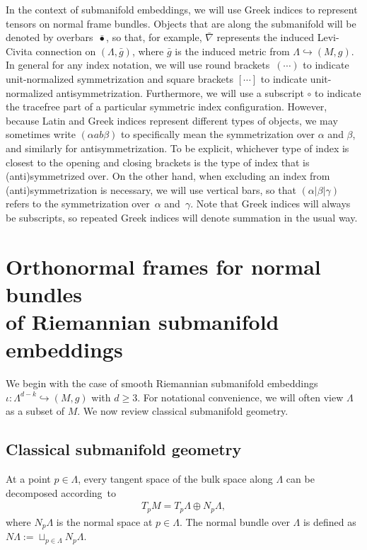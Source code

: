 \documentclass[11pt]{article}
\numberwithin{equation}{section}
\renewcommand{\=}{\stackrel \Lambda =}
\begin{document}
In the context of submanifold embeddings, we will use Greek indices to represent tensors on normal frame bundles. Objects that are along the submanifold will be denoted by overbars~$\bar{\bullet}$, so that, for example, $\bar{\nabla}$ represents the induced Levi-Civita connection on $(\Lambda,\bar{g})$, where $\bar{g}$ is the induced metric from $\Lambda \hookrightarrow (M,g)$. In general for any index notation, we will use round brackets~$(\cdots)$ to indicate unit-normalized symmetrization and square brackets $[\cdots]$ to indicate unit-normalized antisymmetrization. Furthermore, we will use a subscript $\circ$ to indicate the tracefree part of a particular symmetric index configuration. However, because Latin and Greek indices represent different types of objects, we may sometimes write $(\alpha a b \beta)$ to specifically mean the symmetrization over $\alpha$ and $\beta$, and similarly for antisymmetrization. To be explicit, whichever type of index is closest to the opening and closing brackets is the type of index that is (anti)symmetrized over. On the other hand, when excluding an index from (anti)symmetrization is necessary, we will use vertical bars, so that $(\alpha | \beta | \gamma)$ refers to the symmetrization over~$\alpha$ and~$\gamma$. Note that Greek indices will always be subscripts, so repeated Greek indices will denote summation in the usual way.

\section[Orthonormal frames for normal bundles of Riemannian submanifold embeddings]{Orthonormal frames for normal bundles \\ of Riemannian submanifold embeddings} \label{riem-frames}

We begin with the case of smooth Riemannian submanifold embeddings $\iota \colon \Lambda^{d-k} \hookrightarrow (M,g)$ with $d \geq 3$. For notational convenience, we will often view $\Lambda$ as a subset of $M$. We now review classical submanifold geometry.

\subsection{Classical submanifold geometry}

 At a point $p \in \Lambda$, every tangent space of the bulk space along $\Lambda$ can be decomposed according~to
\begin{align} \label{TM-decomp}
T_p M = T_p \Lambda \oplus N_p \Lambda ,
\end{align}
where $N_p \Lambda$ is the normal space at $p \in \Lambda$. The normal bundle over $\Lambda$ is defined as $N \Lambda := \sqcup_{p \in \Lambda} N_p \Lambda$.
\end{document}
